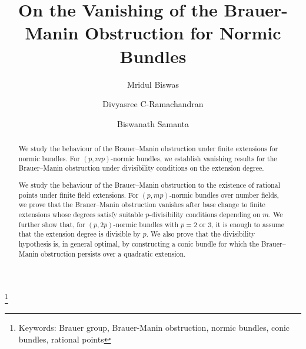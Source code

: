 \documentclass[10pt]{amsart}
\theoremstyle{plain}
\theoremstyle{definition}
\begin{document}
	\title[Vanishing of Brauer--Manin Obstruction under Field Extensions]{On the Vanishing of the Brauer-Manin Obstruction for Normic Bundles}
	\author[M. Biswas]{Mridul Biswas} \address{School of Mathematics and Statistics, University of Canterbury, Christchurch, 8041, New Zealand } 
	\author[D. C-Ramachandran]{Divyasree C-Ramachandran} \address{Department of Mathematics, Indian Institute of Science Education and Research Pune, Dr Homi Bhabha Rd, Pashan, Pune, 411008, India}
    
	\author[B. Samanta]{Biswanath Samanta} \address{Department of Mathematics, Indian Institute of Science Education and Research Mohali, Sector 81, SAS Nagar, 140306, India}
	
	\thanks{Keywords: Brauer group, Brauer-Manin obstruction, normic bundles, conic bundles, rational points}
\begin{abstract}

We study the behaviour of the Brauer--Manin obstruction under finite extensions for normic bundles. For $(p,mp)$-normic bundles, we establish vanishing results for the Brauer–Manin obstruction under divisibility conditions on the extension degree.
\end{abstract}

\begin{abstract}
We study the behaviour of the Brauer--Manin obstruction to the existence of rational points under finite field extensions. For \((p,mp)\)-normic bundles over number fields, we prove that the Brauer--Manin obstruction vanishes after base change to finite extensions whose degrees satisfy suitable \(p\)-divisibility conditions depending on \(m\). We further show that, for \((p,2p)\)-normic bundles with $p=2$ or $3$, it is enough to assume that the extension degree is divisible by \(p\). We also prove that the divisibility hypothesis is, in general optimal, by constructing a conic bundle for which the Brauer--Manin obstruction persists over a quadratic extension.
\end{abstract}

		\maketitle
    


\end{document}
